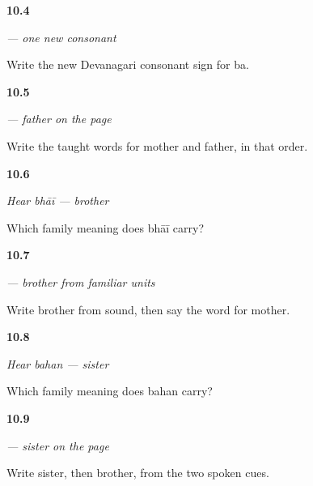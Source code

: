 \noindent\begin{minipage}[t]{\linewidth}
\raggedright
\hypertarget{review-MW-W08-ba-write}{\textbf{10.4}} \emph{ — one new consonant}\par
\small Write the new Devanagari consonant sign for ba.
\end{minipage}\par\medskip

\noindent\begin{minipage}[t]{\linewidth}
\raggedright
\hypertarget{review-MW-C08-baap-pair}{\textbf{10.5}} \emph{ — father on the page}\par
\small Write the taught words for mother and father, in that order.
\end{minipage}\par\medskip

\noindent\begin{minipage}[t]{\linewidth}
\raggedright
\hypertarget{review-MW-C08-hear-bhai-meaning}{\textbf{10.6}} \emph{Hear \emph{bhāī} — brother}\par
\small Which family meaning does bhāī carry?
\end{minipage}\par\medskip

\noindent\begin{minipage}[t]{\linewidth}
\raggedright
\hypertarget{review-MW-C08-bhai-dictation}{\textbf{10.7}} \emph{ — brother from familiar units}\par
\small Write brother from sound, then say the word for mother.
\end{minipage}\par\medskip

\noindent\begin{minipage}[t]{\linewidth}
\raggedright
\hypertarget{review-MW-C08-hear-bahan-meaning}{\textbf{10.8}} \emph{Hear \emph{bahan} — sister}\par
\small Which family meaning does bahan carry?
\end{minipage}\par\medskip

\noindent\begin{minipage}[t]{\linewidth}
\raggedright
\hypertarget{review-MW-C08-bahan-siblings}{\textbf{10.9}} \emph{ — sister on the page}\par
\small Write sister, then brother, from the two spoken cues.
\end{minipage}\par\medskip

